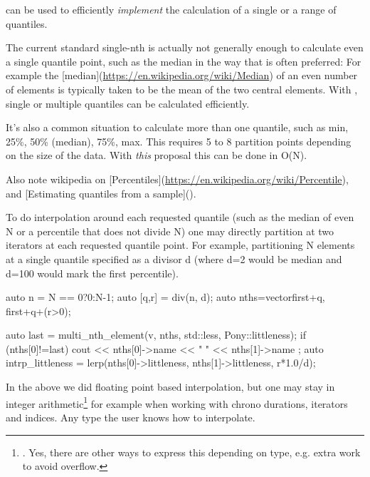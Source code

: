 
 can be used to efficiently \emph{implement} the calculation of a single or a range of quantiles.

The current standard single-nth  is actually not generally enough to calculate even a single quantile point, such as the median in the way that is often preferred: For example the [median](\url{https://en.wikipedia.org/wiki/Median}) of an even number of elements is typically taken  to be the mean of the two central elements. With , single or multiple quantiles can be calculated efficiently.

It's also a common situation to calculate more than one quantile, such as min, 25\%, 50\% (median), 75\%, max. This requires 5 to 8 partition points depending on the size of the data. With \emph{this} proposal this can be done in O(N).

Also note wikipedia on [Percentiles](\url{https://en.wikipedia.org/wiki/Percentile}), and [Estimating quantiles from a
sample]().


To do interpolation around each requested quantile (such as the median of even N or a percentile that does not divide N) one may directly partition at two iterators at each requested quantile point. For example, partitioning N elements at a single quantile specified as a divisor d (where d=2 would be median and d=100 would mark the first percentile).


\begin{codeblock}
auto n = N == 0?0:N-1;
auto [q,r] = div(n, d);
auto nths=vector{first+q, first+q+(r>0)}; 
\end{codeblock}

\begin{codeblock}
auto last = multi_nth_element(v, nths, std::less{}, Pony::littleness);
if (nths[0]!=last){
  cout << nths[0]->name << " " << nths[1]->name ; 
  auto intrp_littleness = lerp(nths[0]->littleness, nths[1]->littleness, r*1.0/d);
}
\end{codeblock}

In the above we did floating point based interpolation, but 
one may stay in integer arithmetic\footnote{. Yes, there are other ways to express this depending on type, e.g. extra work to avoid overflow.}
 for example when working with chrono durations, iterators and indices. Any type the user knows how to interpolate.

